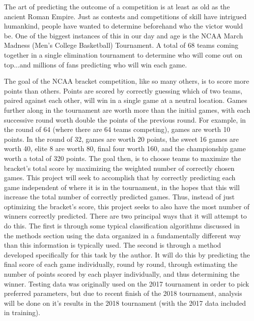 The art of predicting the outcome of a competition is at least as old as the ancient Roman Empire.  
Just as contests and competitions of skill have intrigued humankind, people have wanted to determine beforehand who the victor would be.  
One of the biggest instances of this in our day and age is the NCAA March Madness (Men's College Basketball) Tournament.  
A total of 68 teams coming together in a single elimination tournament to determine who will come out on top...and millions of fans predicting who will win each game.  

The goal of the NCAA bracket competition, like so many others, is to score more points than others.  
Points are scored by correctly guessing which of two teams, paired against each other, will win in a single game at a neutral location.  
Games further along in the tournament are worth more than the initial games, with each successive round worth double the points of the previous round.  
For example, in the round of 64 (where there are 64 teams competing), games are worth 10 points.  In the round of 32, games are worth 20 points, the sweet 16 games are worth 40, elite 8 are worth 80, final four worth 160, and the championship game worth a total of 320 points. 
The goal then, is to choose teams to maximize the bracket's total score by maximizing the weighted number of correctly chosen games.   
This project will seek to accomplish that by correctly predicting each game independent of where it is in the tournament, in the hopes that this will increase the total number of correctly predicted games.    
Thus, instead of just optimizing the bracket's score, this project seeks to also have the most number of winners correctly predicted.  
There are two principal ways that it will attempt to do this.  
The first is through some typical classification algorithms discussed in the methods section using the data organized in a fundamentally different way than this information is typically used.  
The second is through a method developed specifically for this task by the author.  
It will do this by predicting the final score of each game individually, round by round, through estimating the number of points scored by each player individually, and thus determining the winner.  
Testing data was originally used on the 2017 tournament in order to pick preferred parameters, but due to recent finish of the 2018 tournament, analysis will be done on it's results in the 2018 tournament (with the 2017 data included in training).  